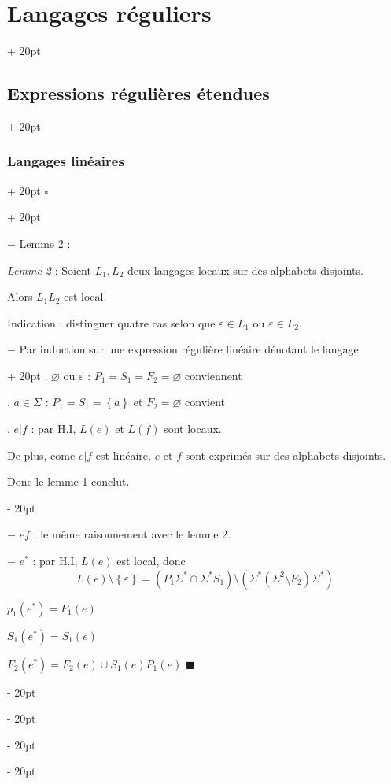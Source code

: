 \documentclass[a4paper, 12pt, twoside]{article}
\newcommand{\lr}[1]{\left( #1 \right)}
\newcommand{\set}[1]{\left\{ #1 \right\}}
\newcommand{\ind}[1][20pt]{\advance\leftskip + #1}
\newcommand{\deind}[1][20pt]{\advance\leftskip - #1}
\newenvironment{indt}[2][20pt]{#2 \par \ind[#1]}{\par \deind} %
\newenvironment{proof}[1][{}]{\begin{indt}{$\square$ #1}}{$\blacksquare$ \end{indt}}
\begin{document}
\begin{indt}{\section{Langages réguliers}}
\begin{indt}{\subsection{Expressions régulières étendues}}
\begin{indt}{\subsubsection{Langages linéaires}}
\begin{proof}

                    \vspace{6pt}
                    
                    $-$ Lemme 2 :
                    \begin{emphBox}
                        \textit{Lemme 2} :
                        Soient $L_1, L_2$ deux langages locaux sur des alphabets disjoints.

                        Alors $L_1 L_2$ est local.
                    \end{emphBox}


                    Indication : distinguer quatre cas selon que $\varepsilon \in L_1$ ou $\varepsilon \in L_2$.

                    \vspace{12pt}
                    
                    \begin{indt}{$-$ Par induction sur une expression régulière linéaire dénotant le langage}
                        . $\varnothing$ ou $\varepsilon$ : $P_1 = S_1 = F_2 = \varnothing$ conviennent

                        . $a \in \Sigma$ : $P_1 = S_1 = \set a$ et $F_2 = \varnothing$ convient

                        . $e | f$ : par H.I, $L(e)$ et $L(f)$ sont locaux.

                        De plus, come $e | f$ est linéaire, $e$ et $f$ sont exprimés sur des alphabets disjoints.

                        Donc le lemme 1 conclut.
                    \end{indt}

                    $-$ $ef$ : le même raisonnement avec le lemme 2.

                    $-$ $e^*$ : par H.I, $L(e)$ est local, donc
                    \[
                        L(e) \setminus \set \varepsilon =
                        \lr{P_1 \Sigma^* \cap \Sigma^* S_1} \setminus \lr{\Sigma^* \lr{\Sigma^2 \setminus F_2} \Sigma^*}
                    \]

                    $p_1(e^*) = P_1(e)$

                    $S_1(e^*) = S_1(e)$

                    $F_2(e^*) = F_2(e) \cup S_1(e) P_1(e)$
                \end{proof}


\end{indt}
\end{indt}
\end{indt}
\end{document}
